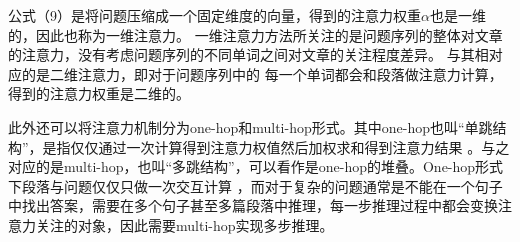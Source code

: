 公式（9）是将问题压缩成一个固定维度的向量，得到的注意力权重$\alpha$也是一维的，因此也称为一维注意力。
一维注意力方法所关注的是问题序列的整体对文章的注意力，没有考虑问题序列的不同单词之间对文章的关注程度差异。
与其相对应的是二维注意力，即对于问题序列中的
每一个单词都会和段落做注意力计算，得到的注意力权重是二维的。




此外还可以将注意力机制分为one-hop和multi-hop形式。其中one-hop也叫“单跳结构”，是指仅仅通过一次计算得到注意力权值然后加权求和得到注意力结果
。与之对应的是multi-hop，也叫“多跳结构”，可以看作是one-hop的堆叠。One-hop形式下段落与问题仅仅只做一次交互计算
，而对于复杂的问题通常是不能在一个句子中找出答案，需要在多个句子甚至多篇段落中推理，每一步推理过程中都会变换注意力关注的对象，因此需要multi-hop实现多步推理。

%		

